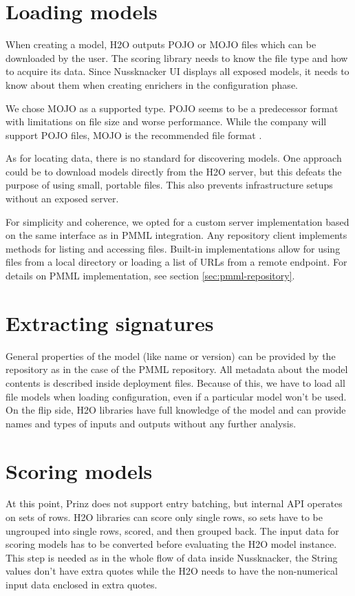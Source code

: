 \section{Loading models}

When creating a model, H2O outputs POJO or MOJO files which can be downloaded by the user.
The scoring library needs to know the file type and how to acquire its data.
Since Nussknacker UI displays all exposed models, it needs to know about them when creating enrichers in the configuration phase.

We chose MOJO as a supported type.
POJO seems to be a predecessor format with limitations on file size and worse performance.
While the company will support POJO files, MOJO is the recommended file format \cite{h2o-mojo-over-pojo}.

As for locating data, there is no standard for discovering models.
One approach could be to download models directly from the H2O server, but this defeats the purpose of using small, portable files.
This also prevents infrastructure setups without an exposed server.

For simplicity and coherence, we opted for a custom server implementation based on the same interface as in PMML integration.
Any repository client implements methods for listing and accessing files.
Built-in implementations allow for using files from a local directory or loading a list of URLs from a remote endpoint.
For details on PMML implementation, see section \ref{sec:pmml-repository}.

\section{Extracting signatures}

General properties of the model (like name or version) can be provided by the repository as in the case of the PMML repository.
All metadata about the model contents is described inside deployment files.
Because of this, we have to load all file models when loading configuration, even if a particular model won't be used.
On the flip side, H2O libraries have full knowledge of the model and can provide names and types of inputs and outputs without any further analysis.

\section{Scoring models}

At this point, Prinz does not support entry batching, but internal API operates on sets of rows.
H2O libraries can score only single rows, so sets have to be ungrouped into single rows, scored, and then grouped back.
The input data for scoring models has to be converted before evaluating the H2O model instance. This step is needed as
in the whole flow of data inside Nussknacker, the \texttt{}{String} values don't have extra quotes while the H2O needs to
have the non-numerical input data enclosed in extra quotes.

